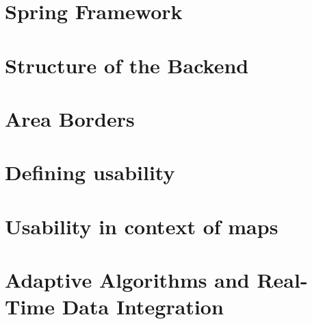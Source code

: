 \section{Spring Framework}


\section{Structure of the Backend}


\section{Area Borders}


\section{Defining usability}


\section{Usability in context of maps}


\section{Adaptive Algorithms and Real-Time Data Integration}


